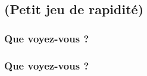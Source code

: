 \subsection{(\textbf{Petit jeu de rapidité})}

\begin{frame}
  \frametitle{Que voyez-vous ?}
  \begin{minipage}[l]{0.49\linewidth}
  \end{minipage}\hfill
  \begin{minipage}[l]{0.49\linewidth}
  \end{minipage}\hfill
\end{frame}

\begin{frame}
  \frametitle{Que voyez-vous ?}
\end{frame}

